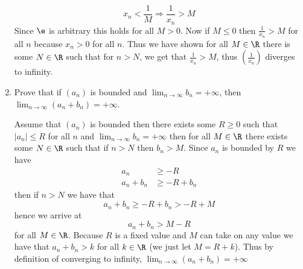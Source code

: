\documentclass[11pt]{exam}
\begin{document}
\begin{enumerate}
\begin{solution}
             $$x_n < \frac{1}{M} \Longrightarrow \frac{1}{x_n} > M$$
             Since $\e$ is arbitrary this holds for all $M > 0$. Now if $M \leq 0$ then $\frac{1}{x_n} > M$ for all $n$ because $x_n > 0$ for all $n$. Thus we have shown for all $M \in \R$ there is some $N \in \R$ such that for $ n> N$, we get that $\frac{1}{x_n} > M$, thus $\left(\frac{1}{x_n}\right)$ diverges to infinity.
            \end{solution}
            \break
        \item Prove that if $(a_n)$ is bounded and $\lim_{n \to \infty} b_n = +\infty$, then $\lim_{n \to \infty} (a_n + b_n) = +\infty$.
            \begin{solution}
                Assume that $(a_n)$ is bounded then there exists some $R \geq 0$ such that $|a_n| \leq R$ for all $n$ and $\lim_{n \to \infty} b_n = +\infty$ then for all $M \in \R$ there exists some $N \in \R$ such that if $n > N$ then $b_n > M$. Since $a_n$ is bounded by $R$ we have  
                \begin{align*}
                    a_n &\geq -R \\
                    a_n + b_n &\geq -R + b_n
                \end{align*}
                then if $n > N$ we have that 
                $$a_n + b_n \geq -R + b_n > -R + M$$
                hence we arrive at 
                $$a_n + b_n > M - R$$
                for all $M \in \R$. Because $R$ is a fixed value and $M$ can take on any value we have that $a_n + b_n > k$ for all $k \in \R$ (we just let $M = R + k$). Thus by definition of converging to infinity, $\lim_{n \to \infty} (a_n + b_n) = +\infty$

            \end{solution}
    \end{enumerate}
\end{document}
